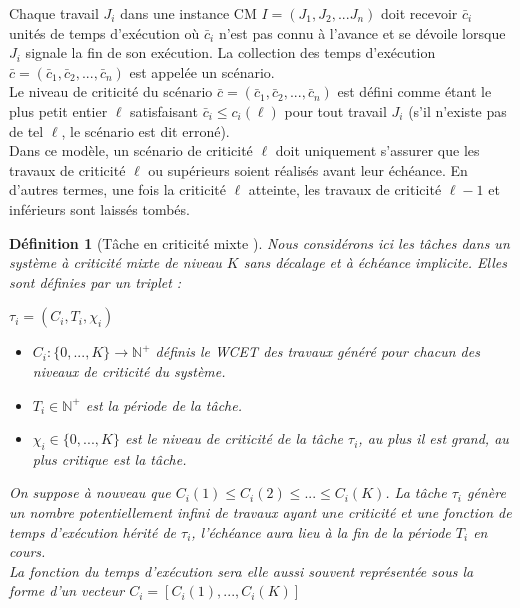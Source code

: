 \documentclass[a4paper]{report}
\theoremstyle{break}
\newtheorem{defin}{Définition}
\theoremstyle{breakplain}
\begin{document}
Chaque travail $J_i$ dans une instance CM $I = (J_1, J_2, ... J_n)$ doit recevoir $\bar{c}_i$ unités de temps d'exécution où $\bar{c}_i$ n'est pas connu à l'avance et se dévoile lorsque $J_i$ signale la fin de son exécution. La collection des temps d'exécution $\bar{c} = (\bar{c}_1, \bar{c}_2, ..., \bar{c}_n)$ est appelée un scénario.\\
Le niveau de criticité du scénario $\bar{c} = (\bar{c}_1, \bar{c}_2, ..., \bar{c}_n)$ est défini comme étant le plus petit entier $\ell$ satisfaisant $\bar{c}_i \leq c_i(\ell)$ pour tout travail $J_i$ (s'il n'existe pas de tel $\ell$, le scénario est dit erroné).\\

Dans ce modèle, un scénario de criticité $\ell$ doit uniquement s'assurer que les travaux de criticité $\ell$ ou supérieurs soient réalisés avant leur échéance. En d'autres termes, une fois la criticité $\ell$ atteinte, les travaux de criticité $\ell-1$ et inférieurs sont laissés tombés.

\begin{defin}[Tâche en criticité mixte \cite{BaruahBDMSS11}]
Nous considérons ici les tâches dans un système à criticité mixte de niveau $K$ sans décalage et à échéance implicite. Elles sont définies par un triplet :
\begin{center}
$\tau_i = (C_i, T_i, \chi_i)$\\
\end{center}
\begin{itemize}
\item $C_i : \{0, ..., K\} \rightarrow \mathbb{N}^{+}$ définis le WCET des travaux généré pour chacun des niveaux de criticité du système.
\item $T_i \in \mathbb{N}^{+}$ est la période de la tâche.
\item $\chi_i \in \{0, ..., K\}$ est le niveau de criticité de la tâche $\tau_i$, au plus il est grand, au plus critique est la tâche.
\end{itemize}
On suppose à nouveau que $C_i(1) \leq C_i(2) \leq ... \leq C_i(K)$. La tâche $\tau_i$ génère un nombre potentiellement infini de travaux ayant une criticité et une fonction de temps d'exécution hérité de $\tau_i$, l'échéance aura lieu à la fin de la période $T_i$ en cours.\\
La fonction du temps d'exécution sera elle aussi souvent représentée sous la forme d'un vecteur $C_i = [C_i(1), ..., C_i(K)]$
\end{defin}
\end{document}
